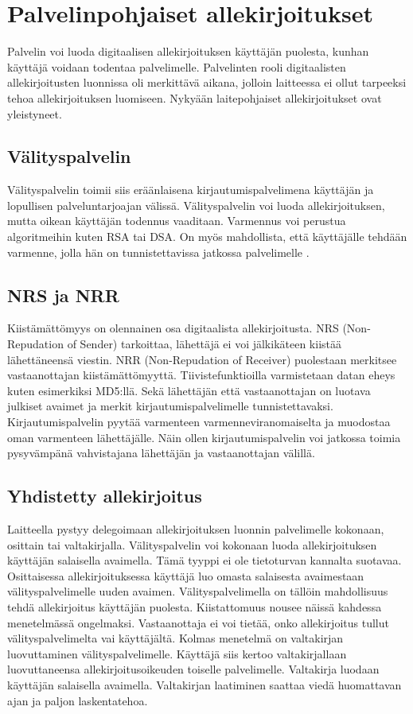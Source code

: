 \documentclass[finnish]{tktltiki2}
\theoremstyle{definition}
\theoremstyle{remark}
\begin{document}
\section{Palvelinpohjaiset allekirjoitukset}

Palvelin voi luoda digitaalisen allekirjoituksen käyttäjän puolesta, kunhan käyttäjä voidaan todentaa palvelimelle. Palvelinten rooli digitaalisten allekirjoitusten luonnissa oli merkittävä aikana, jolloin laitteessa ei ollut tarpeeksi tehoa allekirjoituksen luomiseen. Nykyään laitepohjaiset allekirjoitukset ovat yleistyneet. \cite{proxy} 

\subsection{Välityspalvelin}

Välityspalvelin toimii siis eräänlaisena kirjautumispalvelimena käyttäjän ja lopullisen palveluntarjoajan välissä. Välityspalvelin voi luoda allekirjoituksen, mutta oikean käyttäjän todennus vaaditaan. Varmennus voi perustua algoritmeihin kuten RSA tai DSA. On myös mahdollista, että käyttäjälle tehdään varmenne, jolla hän on tunnistettavissa jatkossa palvelimelle \cite{proxy}.

\subsection{NRS ja NRR}

Kiistämättömyys on olennainen osa digitaalista allekirjoitusta. NRS (Non-Repudation of Sender) tarkoittaa, lähettäjä ei voi jälkikäteen kiistää lähettäneensä viestin. NRR (Non-Repudation of Receiver) puolestaan merkitsee vastaanottajan kiistämättömyyttä. Tiivistefunktioilla varmistetaan datan eheys kuten esimerkiksi MD5:llä. Sekä lähettäjän että vastaanottajan on luotava julkiset avaimet ja merkit kirjautumispalvelimelle tunnistettavaksi. Kirjautumispalvelin pyytää varmenteen varmenneviranomaiselta ja muodostaa oman varmenteen lähettäjälle. Näin ollen kirjautumispalvelin voi jatkossa toimia pysyvämpänä vahvistajana lähettäjän ja vastaanottajan välillä. \cite{gene}

\subsection{Yhdistetty allekirjoitus}

Laitteella pystyy delegoimaan allekirjoituksen luonnin palvelimelle kokonaan, osittain tai valtakirjalla. Välityspalvelin voi kokonaan luoda allekirjoituksen käyttäjän salaisella avaimella. Tämä tyyppi ei ole tietoturvan kannalta suotavaa. Osittaisessa allekirjoituksessa käyttäjä luo omasta salaisesta avaimestaan välityspalvelimelle uuden avaimen. Välityspalvelimella on tällöin mahdollisuus tehdä allekirjoitus käyttäjän puolesta. Kiistattomuus nousee näissä kahdessa menetelmässä ongelmaksi. Vastaanottaja ei voi tietää, onko allekirjoitus tullut välityspalvelimelta vai käyttäjältä. Kolmas menetelmä on valtakirjan luovuttaminen välityspalvelimelle. Käyttäjä siis kertoo valtakirjallaan luovuttaneensa allekirjoitusoikeuden toiselle palvelimelle. Valtakirja luodaan käyttäjän salaisella avaimella. Valtakirjan laatiminen saattaa viedä huomattavan ajan ja paljon laskentatehoa. \cite{joint}
\end{document}
